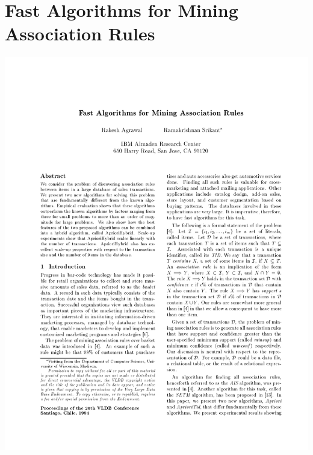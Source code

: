 \section{Fast Algorithms for Mining Association Rules}
\hspace*{-1.5cm}
\includegraphics[page=1,scale=0.75]{./appendix/apriori.pdf}


